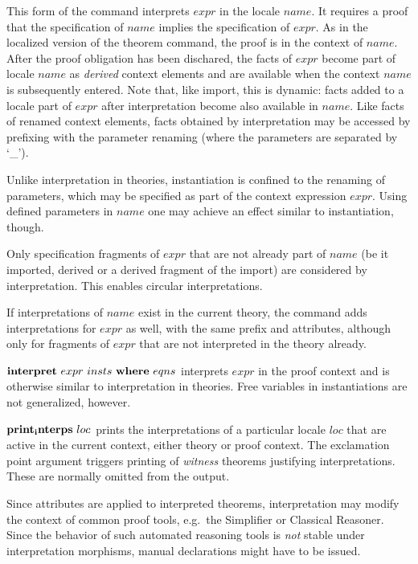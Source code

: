 \begin{descr}
  This form of the command interprets $expr$ in the locale $name$.  It
  requires a proof that the specification of $name$ implies the
  specification of $expr$.  As in the localized version of the theorem
  command, the proof is in the context of $name$.  After the proof
  obligation has been dischared, the facts of $expr$
  become part of locale $name$ as \emph{derived} context elements and
  are available when the context $name$ is subsequently entered.
  Note that, like import, this is dynamic: facts added to a locale
  part of $expr$ after interpretation become also available in
  $name$.  Like facts
  of renamed context elements, facts obtained by interpretation may be
  accessed by prefixing with the parameter renaming (where the parameters
  are separated by `\_').

  Unlike interpretation in theories, instantiation is confined to the
  renaming of parameters, which may be specified as part of the context
  expression $expr$.  Using defined parameters in $name$ one may
  achieve an effect similar to instantiation, though.

  Only specification fragments of $expr$ that are not already part of
  $name$ (be it imported, derived or a derived fragment of the import)
  are considered by interpretation.  This enables circular
  interpretations.

  If interpretations of $name$ exist in the current theory, the
  command adds interpretations for $expr$ as well, with the same
  prefix and attributes, although only for fragments of $expr$ that
  are not interpreted in the theory already.

\item [${\mathord{\mathbf{interpret}}}~expr~insts~{\mathord{\mathbf{where}}}~eqns$]
  interprets $expr$ in the proof context and is otherwise similar to
  interpretation in theories.  Free variables in instantiations are not
  generalized, however.

\item [${\mathord{\mathbf{print_interps}}}~loc$]
  prints the interpretations of a particular locale $loc$ that are
  active in the current context, either theory or proof context.  The
  exclamation point argument triggers printing of
  \emph{witness} theorems justifying interpretations.  These are
  normally omitted from the output.

  
\end{descr}

\begin{warn}
  Since attributes are applied to interpreted theorems, interpretation
  may modify the context of common proof tools, e.g.\ the Simplifier
  or Classical Reasoner.  Since the behavior of such automated
  reasoning tools is \emph{not} stable under interpretation morphisms,
  manual declarations might have to be issued.
\end{warn}

